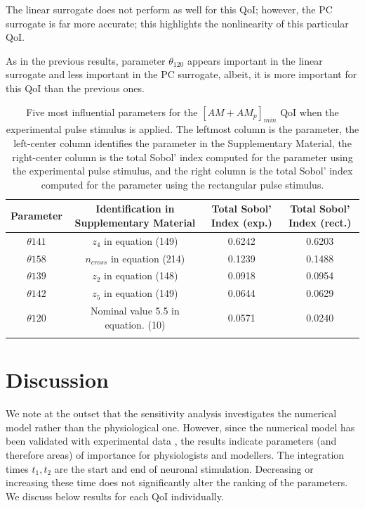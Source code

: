 \documentclass[smallextended]{svjour3}
\newcommand{\ra}[1]{\renewcommand{\arraystretch}{#1}}
\numberwithin{equation}{section}
\begin{document}
The linear surrogate does not perform as well for this QoI; however, the PC surrogate is far more accurate; this highlights the nonlinearity of this particular QoI. 

 As in the previous results, parameter $\theta_{120}$ appears important in the linear surrogate and less important in the PC surrogate, albeit, it is more important for this QoI than the previous ones.

\begin{table}[h]
\centering
\ra{1.3}
\begin{tabular}{cccc}
\toprule
Parameter & Identification in Supplementary Material & Total Sobol' Index (exp.) & Total Sobol' Index (rect.) \\
\midrule
$\theta{141}$ & $z_4$ in equation (149)  & 0.6242 & 0.6203\\
$\theta{158}$ & $n_{cross}$ in equation (214)  & 0.1239 & 0.1488\\
$\theta{139}$ &  $z_2$ in equation (148)  & 0.0918 & 0.0954\\
$\theta{142}$ & $z_5$ in equation (149)  &0.0644 & 0.0629\\
$\theta{120}$ & Nominal value 5.5 in equation. (10)  & 0.0571 & 0.0240\\
 \arrayrulecolor{black}\bottomrule
\end{tabular}
\caption{Five most influential parameters for the $[AM+AM_p]_{min}$ QoI when the experimental pulse stimulus is applied. The leftmost column is the parameter, the left-center column identifies the parameter in the Supplementary Material, the right-center column is the total Sobol' index computed for the parameter using the experimental pulse stimulus, and the right column is the total Sobol' index computed for the parameter using the rectangular pulse stimulus.}
\label{tab:qoi_AM_AMp_Min}
\end{table}

\section{Discussion}
We  note at the outset that the sensitivity analysis investigates the numerical model rather than the physiological one. However, since the numerical model has been validated with experimental data  \cite{Dormanns2015,Mathias2018},  the results indicate parameters (and therefore areas) of importance for physiologists and modellers. The integration times $t_1,t_2$ are the start and end of neuronal stimulation. Decreasing or increasing these time does not significantly alter the ranking of the parameters. We discuss below results for each QoI individually. 
\end{document}
